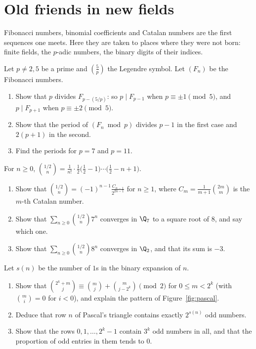 \section{Old friends in new fields}

Fibonacci numbers, binomial coefficients and Catalan numbers are the first sequences one meets. Here they are taken to places
where they were not born: finite fields, the $p$-adic numbers, the binary digits of their indices.

\begin{exercise}[$\star\star$]\label{pb:fibmodp}
Let $p\ne2,5$ be a prime and $\left(\frac5p\right)$ the Legendre symbol. Let $(F_n)$ be the Fibonacci numbers.
\begin{enumerate}[label=(\alph*)]
\item Show that $p$ divides $F_{p-(5/p)}$: so $p\mid F_{p-1}$ when $p\equiv\pm1\pmod5$, and $p\mid F_{p+1}$ when
$p\equiv\pm2\pmod5$.
\item Show that the period of $(F_n\bmod p)$ divides $p-1$ in the first case and $2(p+1)$ in the second.
\item Find the periods for $p=7$ and $p=11$.
\end{enumerate}
\end{exercise}

\begin{exercise}[$\star\star$]\label{pb:whichroot}
For $n\ge0$, $\binom{1/2}n=\frac1{n!}\cdot\frac12\bigl(\frac12-1\bigr)\cdots\bigl(\frac12-n+1\bigr)$.
\begin{enumerate}[label=(\alph*)]
\item Show that $\binom{1/2}n=(-1)^{n-1}\frac{C_{n-1}}{2^{2n-1}}$ for $n\ge1$, where $C_m=\frac1{m+1}\binom{2m}m$ is the $m$-th
Catalan number.
\item Show that $\sum_{n\ge0}\binom{1/2}n7^n$ converges in $\Q_7$ to a square root of $8$, and say which one.
\item Show that $\sum_{n\ge0}\binom{1/2}n8^n$ converges in $\Q_2$, and that its sum is $-3$.
\end{enumerate}
\end{exercise}

\begin{exercise}[$\star$]\label{pb:pascal2}
Let $s(n)$ be the number of $1$s in the binary expansion of $n$.
\begin{enumerate}[label=(\alph*)]
\item Show that $\binom{2^k+m}j\equiv\binom mj+\binom m{j-2^k}\pmod2$ for $0\le m<2^k$ (with $\binom mi=0$ for $i<0$),
and explain the pattern of Figure~\ref{fig:pascal}.
\item Deduce that row $n$ of Pascal's triangle contains exactly $2^{s(n)}$ odd numbers.
\item Show that the rows $0,1,\dots,2^k-1$ contain $3^k$ odd numbers in all, and that the proportion of odd entries in them
tends to $0$.
\end{enumerate}
\end{exercise}

